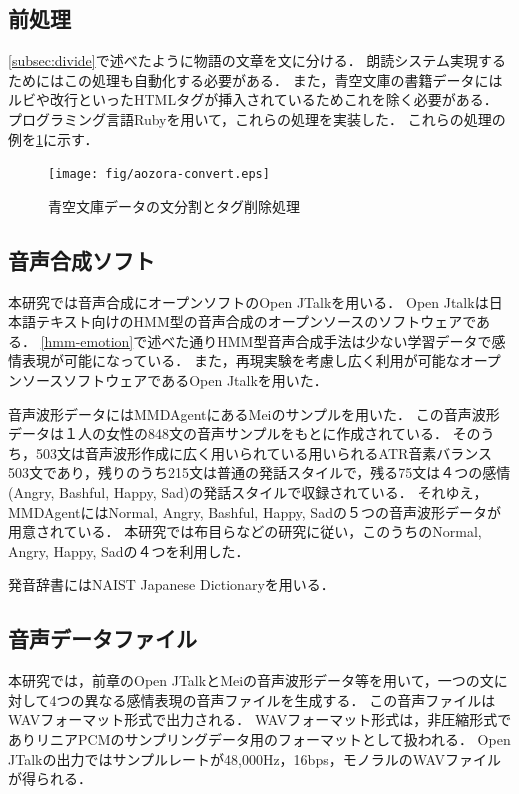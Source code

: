 \subsection{前処理}
\ref{subsec:divide}で述べたように物語の文章を文に分ける．
朗読システム実現するためにはこの処理も自動化する必要がある．
また，青空文庫の書籍データにはルビや改行といったHTMLタグが挿入されているためこれを除く必要がある．
プログラミング言語Rubyを用いて，これらの処理を実装した．
これらの処理の例を\ref{fig:aozora-convert}に示す．

\begin{figure}[hb]
  \begin{center}
    \texttt{[image: fig/aozora-convert.eps]}
    \caption{青空文庫データの文分割とタグ削除処理}
    \label{fig:aozora-convert}
  \end{center}
\end{figure}

\subsection{音声合成ソフト}
本研究では音声合成にオープンソフトのOpen JTalk\cite{jtalk}を用いる．
Open Jtalkは日本語テキスト向けのHMM型の音声合成のオープンソースのソフトウェアである．
\ref{hmm-emotion}で述べた通りHMM型音声合成手法は少ない学習データで感情表現が可能になっている．
また，再現実験を考慮し広く利用が可能なオープンソースソフトウェアであるOpen Jtalkを用いた．


音声波形データにはMMDAgent\cite{mei}にあるMeiのサンプルを用いた．
この音声波形データは１人の女性の848文の音声サンプルをもとに作成されている．
そのうち，503文は音声波形作成に広く用いられている用いられるATR音素バランス503文\cite{atr}であり，残りのうち215文は普通の発話スタイルで，残る75文は４つの感情(Angry, Bashful, Happy, Sad)の発話スタイルで収録されている．
それゆえ，MMDAgentにはNormal, Angry, Bashful, Happy, Sadの５つの音声波形データが用意されている．
本研究では布目ら\cite{fume}などの研究に従い，このうちのNormal, Angry, Happy, Sadの４つを利用した．


発音辞書にはNAIST Japanese Dictionary\cite{naist}を用いる．

\subsection{音声データファイル}
本研究では，前章のOpen JTalkとMeiの音声波形データ等を用いて，一つの文に対して4つの異なる感情表現の音声ファイルを生成する．
この音声ファイルはWAVフォーマット形式で出力される．
WAVフォーマット形式は，非圧縮形式でありリニアPCMのサンプリングデータ用のフォーマットとして扱われる．
Open JTalkの出力ではサンプルレートが48,000Hz，16bps，モノラルのWAVファイルが得られる．

